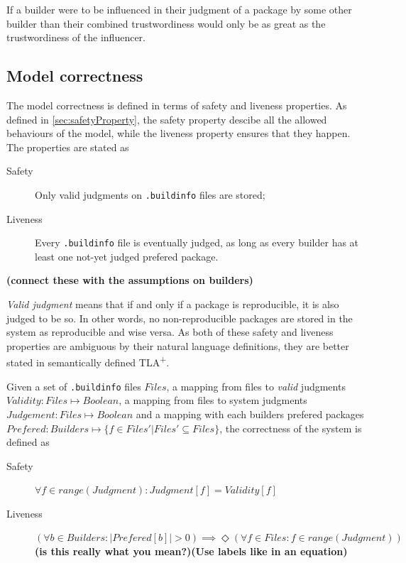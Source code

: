 \documentclass[english, biblatex, digitaloutput]{kththesis}
\begin{document}
If a builder were to be influenced in their judgment of a package by some other builder than their combined trustwordiness would only be as great as the trustwordiness of the influencer.

\subsection{Model correctness}
\label{sec:modelCorrectness}

The model correctness is defined in terms of safety and liveness properties. As defined in \ref{sec:safetyProperty}, the safety property descibe all the allowed behaviours of the model, while the liveness property ensures that they happen. The properties are stated as


\begin{description}
	\item[Safety] Only valid judgments on \texttt{.buildinfo} files are stored;
	\item[Liveness] Every \texttt{.buildinfo} file is eventually judged, as long as every builder has at least one not-yet judged prefered package.
\end{description}

\textbf{(connect these with the assumptions on builders)}

\textit{Valid judgment} means that if and only if a package is reproducible, it is also judged to be so. In other words, no non-reproducible packages are stored in the system as reproducible and wise versa. As both of these safety and liveness properties are ambiguous by their natural language definitions, they are better stated in semantically defined TLA\textsuperscript+.

Given a set of \texttt{.buildinfo} files $Files$, a mapping from files to \textit{valid} judgments $Validity: Files \mapsto Boolean$, a mapping from files to system judgments $Judgement: Files \mapsto Boolean$ and a mapping with each builders prefered packages $Prefered: Builders \mapsto \{f \in Files'| Files' \subseteq Files\}$, the correctness of the system is defined as

\begin{description}
	\item[Safety] $\forall f \in range(Judgment): Judgment[f] = Validity[f]$
	\item[Liveness] $(\forall b \in Builders: |Prefered[b]| > 0) \implies \Diamond(\forall f \in Files: f \in range(Judgment))$ \textbf{(is this really what you mean?)(Use labels like in an equation)}
\end{description}
\end{document}
